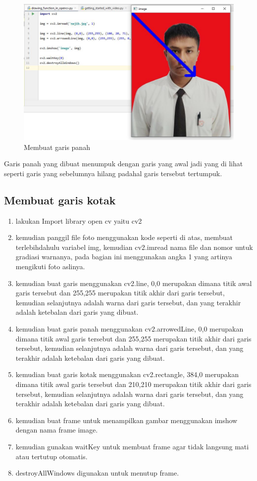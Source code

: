 \newpage
\begin{figure}[ht]
\centering
\includegraphics[scale=0.55]{figures/2,10.jpg}
\caption{Membuat garis panah}
\label{contoh}
\end{figure}

Garis panah yang dibuat menumpuk dengan garis yang awal jadi yang di lihat seperti garis yang sebelumnya hilang padahal garis tersebut tertumpuk.

\newpage
\subsection{Membuat garis kotak}

\begin{enumerate}
	\item lakukan Import library open cv yaitu cv2
	\item kemudian panggil file foto menggunakan kode seperti di atas, membuat terlebihdahulu variabel img, kemudian cv2.imread nama file dan nomor untuk gradiasi warnanya, pada bagian ini menggunakan angka 1 yang artinya mengikuti foto aslinya.
	\item kemudian buat garis menggunakan cv2.line, 0,0 merupakan dimana titik awal garis tersebut dan 255,255 merupakan titik akhir dari garis tersebut, kemudian selanjutnya adalah warna dari garis tersebut, dan yang terakhir adalah ketebalan dari garis yang dibuat.
	\item kemudian buat garis panah menggunakan cv2.arrowedLine, 0,0 merupakan dimana titik awal garis tersebut dan 255,255 merupakan titik akhir dari garis tersebut, kemudian selanjutnya adalah warna dari garis tersebut, dan yang terakhir adalah ketebalan dari garis yang dibuat.
	\item kemudian buat garis kotak menggunakan cv2.rectangle, 384,0 merupakan dimana titik awal garis tersebut dan 210,210 merupakan titik akhir dari garis tersebut, kemudian selanjutnya adalah warna dari garis tersebut, dan yang terakhir adalah ketebalan dari garis yang dibuat.
	\item kemudian buat frame untuk menampilkan gambar menggunakan imshow dengan nama frame image.
	\item kemudian gunakan waitKey untuk membuat frame agar tidak langsung mati atau tertutup otomatis.
	\item destroyAllWindows digunakan untuk menutup frame.
\end{enumerate}

